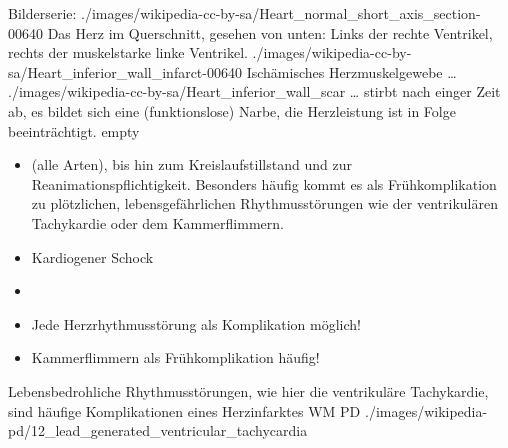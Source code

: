\begin{PictureSeriesWide}{}{Bilderserie:
}
{./images/wikipedia-cc-by-sa/Heart_normal_short_axis_section-00640}
{Das Herz im Querschnitt, gesehen von unten: Links der
rechte Ventrikel, rechts der muskelstarke linke Ventrikel.
 }
{./images/wikipedia-cc-by-sa/Heart_inferior_wall_infarct-00640}
{Ischämisches Herzmuskelgewebe {\ldots}
} 
{./images/wikipedia-cc-by-sa/Heart_inferior_wall_scar}
{{\ldots} stirbt nach einger Zeit ab, es bildet sich eine
(funktionslose) Narbe, die Herzleistung ist in Folge beeinträchtigt. 
}
{empty}
{}
\end{PictureSeriesWide}

  
\TextSlide{\TxKomplikationen}
{%
\begin{itemize}
  \item {} (alle Arten), bis hin
  zum Kreislaufstillstand und zur Reanimationspflichtigkeit.
  Besonders häufig kommt es als Frühkomplikation zu plötzlichen, 
  lebensgefährlichen Rhythmusstörungen wie der ventrikulären 
  Tachykardie oder dem Kammerflimmern.
  \item Kardiogener Schock 
\end{itemize}
}{
\begin{itemize}
  \item {}
  \item Jede Herzrhythmusstörung als Komplikation möglich!
  \item Kammerflimmern als Frühkomplikation häufig!
\end{itemize}

}{}{}{}




\Picture
{Lebensbedrohliche Rhythmusstörungen, wie hier die
ventrikuläre Tachykardie, sind häufige Komplikationen eines
Herzinfarktes}%
{}%
{}%
{WM}%
{PD}%
{./images/wikipedia-pd/12_lead_generated_ventricular_tachycardia}%
{}%
{}%





